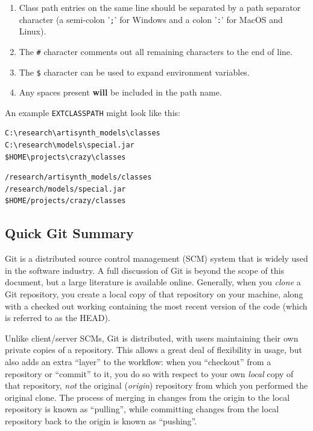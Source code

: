 \begin{enumerate}

\item Class path entries on the same line should be separated by a
path separator character (a semi-colon '{\tt ;}' for Windows
and a colon '{\tt :}' for MacOS and Linux).

\item The {\tt \#} character comments out all remaining characters
to the end of line.

\item The {\tt \$} character can be used to expand environment variables.

\item Any spaces present {\bf will} be included in the path name.

\end{enumerate}

An example {\tt EXTCLASSPATH} might look like this:

\ifWindows
\begin{verbatim}
C:\research\artisynth_models\classes
C:\research\models\special.jar
$HOME\projects\crazy\classes
\end{verbatim}
\else
\begin{verbatim}
/research/artisynth_models/classes
/research/models/special.jar
$HOME/projects/crazy/classes
\end{verbatim}
\fi

\subsection{Quick Git Summary}
\label{GitSummary}

Git is a distributed source control management (SCM) system that is
widely used in the software industry.  A full discussion of Git is
beyond the scope of this document, but a large literature is available
online. Generally, when you {\it clone} a Git repository, you create a
local copy of that repository on your machine, along with a checked
out working \directory{} containing the most recent version of the code
(which is referred to as the HEAD).

Unlike client/server SCMs, Git is distributed, with users maintaining
their own private copies of a repository. This allows a great deal of
flexibility in usage, but also adds an extra ``layer'' to the
workflow: when you ``checkout'' from a repository or ``commit'' to it,
you do so with respect to your own {\it local} copy of that
repository, {\it not} the original ({\it origin}) repository from
which you performed the original clone. The process of merging in
changes from the origin to the local repository is known as
``pulling'', while committing changes from the local repository back
to the origin is known as ``pushing''.


